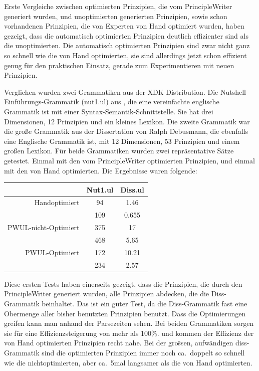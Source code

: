 Erste Vergleiche zwischen optimierten Prinzipien, die vom
PrincipleWriter generiert wurden, und unoptimierten generierten
Prinzipien, sowie schon vorhandenen Prinzipien, die von Experten von
Hand optimiert wurden, haben gezeigt, dass die automatisch optimierten
Prinzipien deutlich effizienter sind als die unoptimierten. Die
automatisch optimierten Prinzipien sind zwar nicht ganz so schnell wie
die von Hand optimierten, sie sind allerdings jetzt schon effizient
genug f\"ur den praktischen Einsatz, gerade zum Experimentieren mit
neuen Prinzipien.

Verglichen wurden zwei Grammatiken aus der XDK-Distribution. Die
Nutshell-Einf\"uhrungs-Grammatik (nut1.ul) aus \cite{Debusmann06}, die
eine vereinfachte englische Grammatik ist mit einer
Syntax-Semantik-Schnittstelle. Sie hat drei Dimensionen, 12 Prinzipien
und ein kleines Lexikon.  Die zweite Grammatik war die gro{\ss}e
Grammatik aus der Dissertation von Ralph Debusmann, die ebenfalls eine
Englische Grammatik ist, mit 12 Dimensionen, 53 Prinzipien und einem
gro{\ss}en Lexikon.  F\"ur beide Grammatiken wurden zwei
repr\"asentative S\"atze getestet. Einmal mit den vom PrincipleWriter
optimierten Prinzipien, und einmal mit den von Hand optimierten. Die
Ergebnisse waren folgende:
\begin{center}
\begin{tabular}{| r | c | c|}
\hline
 & Nut1.ul & Diss.ul \\
\hline
Handoptimiert & 94 & 1.46 \\
 & 109 & 0.655 \\
\hline
PWUL-nicht-Optimiert &  375 & 17\\
 & 468 & 5.65\\
\hline 
PWUL-Optimiert & 172 & 10.21 \\
 & 234 & 2.57 \\
\hline
\end{tabular}
\end{center}
Diese ersten Tests haben einerseits gezeigt, dass die Prinzipien, die
durch den PrincipleWriter generiert wurden, alle Prinzipien abdecken,
die die Diss-Grammatik beinhaltet. Das ist ein guter Test, da die
Diss-Grammatik fast eine Obermenge aller bisher benutzten Prinzipien
benutzt.  Dass die Optimierungen greifen kann man anhand der
Parsezeiten sehen. Bei beiden Grammatiken sorgen sie f\"ur eine
Effizienzsteigerung von mehr als 100\%.  und kommen der Effizienz der
von Hand optimierten Prinzipien recht nahe. Bei der gro\"ssen,
aufw\"andigen diss-Grammatik sind die optimierten Prinzipien immer
noch ca.\ doppelt so schnell wie die nichtoptimierten, aber ca.\ 5mal
langsamer als die von Hand optimierten.

